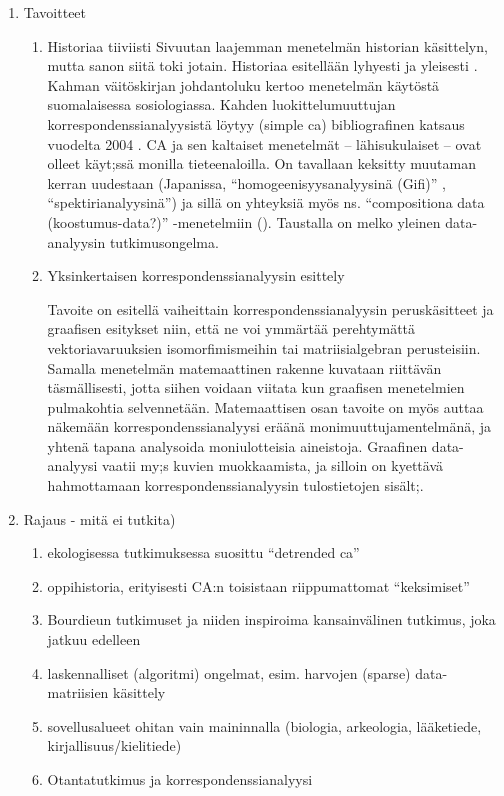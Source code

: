 \begin{enumerate}
\bigskip

\item Tavoitteet
\begin{enumerate} %
\item Historiaa tiiviisti
Sivuutan laajemman menetelmän historian käsittelyn, mutta sanon siitä toki jotain. Historiaa esitellään lyhyesti ja yleisesti \cite{RefWorks:68}. Kahman väitöskirjan \cite{RefWorks:74} johdantoluku kertoo menetelmän käytöstä suomalaisessa sosiologiassa. Kahden luokittelumuuttujan korrespondenssianalyysistä löytyy (simple ca) bibliografinen katsaus vuodelta 2004 \cite{RefWorks:70}. CA ja sen kaltaiset menetelmät -- lähisukulaiset -- ovat  olleet käyt;ssä monilla tieteenaloilla. On tavallaan keksitty muutaman kerran uudestaan (Japanissa, ``homogeenisyysanalyysinä (Gifi)'' , ``spektirianalyysinä'') ja sillä on yhteyksiä myös ns. ``compositiona data (koostumus-data?)'' -menetelmiin (\cite {RefWorks:55}). Taustalla on melko yleinen data-analyysin tutkimusongelma.

\item Yksinkertaisen korrespondenssianalyysin esittely

Tavoite on esitellä vaiheittain korrespondenssianalyysin peruskäsitteet ja graafisen esitykset niin, että ne voi ymmärtää perehtymättä vektoriavaruuksien isomorfimismeihin tai matriisialgebran perusteisiin. Samalla menetelmän matemaattinen rakenne kuvataan riittävän täsmällisesti, jotta siihen voidaan viitata kun graafisen menetelmien pulmakohtia selvennetään. Matemaattisen osan tavoite on myös auttaa näkemään korrespondenssianalyysi eräänä monimuuttujamentelmänä, ja yhtenä tapana analysoida moniulotteisia aineistoja. Graafinen data-analyysi vaatii my;s kuvien muokkaamista, ja silloin on kyettävä hahmottamaan korrespondenssianalyysin tulostietojen sisält;.

\end{enumerate} %
\bigskip
\item Rajaus - mitä ei tutkita)
\begin{enumerate} %
\item ekologisessa tutkimuksessa suosittu ``detrended ca''
\item oppihistoria, erityisesti CA:n toisistaan riippumattomat ``keksimiset''
\item Bourdieun tutkimuset ja niiden inspiroima kansainvälinen tutkimus, joka jatkuu edelleen
\item laskennalliset (algoritmi) ongelmat, esim. harvojen (sparse) data-matriisien käsittely
\item sovellusalueet ohitan vain maininnalla (biologia, arkeologia, lääketiede, kirjallisuus/kielitiede)
\item Otantatutkimus ja korrespondenssianalyysi\\


\end{enumerate}
\end{enumerate}
